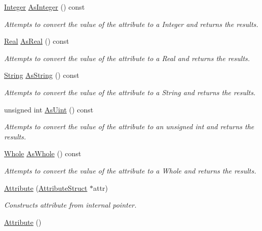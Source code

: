\begin{DoxyCompactItemize}
\hyperlink{namespacephys_a7f09bf5585b2bb97613cd9aad4273a81}{Integer} \hyperlink{classphys_1_1xml_1_1Attribute_a6f7ae9a3fe3ad8d88823d97e8fa04973}{AsInteger} () const 
\begin{DoxyCompactList}\small\item\em Attempts to convert the value of the attribute to a Integer and returns the results. \item\end{DoxyCompactList}\item 
\hyperlink{namespacephys_af7eb897198d265b8e868f45240230d5f}{Real} \hyperlink{classphys_1_1xml_1_1Attribute_a1ed9ffa5461223647168309ae4c86809}{AsReal} () const 
\begin{DoxyCompactList}\small\item\em Attempts to convert the value of the attribute to a Real and returns the results. \item\end{DoxyCompactList}\item 
\hyperlink{namespacephys_1_1xml_a4d8ca7638328d16d303e5a4c849f4704}{String} \hyperlink{classphys_1_1xml_1_1Attribute_a7b6b2e3e8c8f262dfca1b97d904c638a}{AsString} () const 
\begin{DoxyCompactList}\small\item\em Attempts to convert the value of the attribute to a String and returns the results. \item\end{DoxyCompactList}\item 
unsigned int \hyperlink{classphys_1_1xml_1_1Attribute_ad00ec5857fc4afcda892a0057419a9a0}{AsUint} () const 
\begin{DoxyCompactList}\small\item\em Attempts to convert the value of the attribute to an unsigned int and returns the results. \item\end{DoxyCompactList}\item 
\hyperlink{namespacephys_a460f6bc24c8dd347b05e0366ae34f34a}{Whole} \hyperlink{classphys_1_1xml_1_1Attribute_ac40df65f4914609554d99e72624eb8d2}{AsWhole} () const 
\begin{DoxyCompactList}\small\item\em Attempts to convert the value of the attribute to a Whole and returns the results. \item\end{DoxyCompactList}\item 
\hyperlink{classphys_1_1xml_1_1Attribute_a6786df9d66c675c5a55761a7d3d512a5}{Attribute} (\hyperlink{classAttributeStruct}{AttributeStruct} $\ast$attr)
\begin{DoxyCompactList}\small\item\em Constructs attribute from internal pointer. \item\end{DoxyCompactList}\item 
\hypertarget{classphys_1_1xml_1_1Attribute_a962ad273e447bb714925c331e00cc3e7}{
\hyperlink{classphys_1_1xml_1_1Attribute_a962ad273e447bb714925c331e00cc3e7}{Attribute} ()}
\label{classphys_1_1xml_1_1Attribute_a962ad273e447bb714925c331e00cc3e7}


\end{DoxyCompactItemize}
